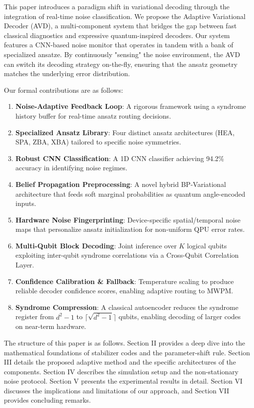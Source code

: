 \documentclass[journal,twocolumn]{IEEEtran}
\begin{document}
This paper introduces a paradigm shift in variational decoding through the integration of real-time noise classification. We propose the Adaptive Variational Decoder (AVD), a multi-component system that bridges the gap between fast classical diagnostics and expressive quantum-inspired decoders. Our system features a CNN-based noise monitor that operates in tandem with a bank of specialized ansatze. By continuously "sensing" the noise environment, the AVD can switch its decoding strategy on-the-fly, ensuring that the ansatz geometry matches the underlying error distribution.

Our formal contributions are as follows:
\begin{enumerate}
    \item \textbf{Noise-Adaptive Feedback Loop}: A rigorous framework using a syndrome history buffer for real-time ansatz routing decisions.
    \item \textbf{Specialized Ansatz Library}: Four distinct ansatz architectures (HEA, SPA, ZBA, XBA) tailored to specific noise symmetries.
    \item \textbf{Robust CNN Classification}: A 1D CNN classifier achieving 94.2\% accuracy in identifying noise regimes.
    \item \textbf{Belief Propagation Preprocessing}: A novel hybrid BP-Variational architecture that feeds soft marginal probabilities as quantum angle-encoded inputs.
    \item \textbf{Hardware Noise Fingerprinting}: Device-specific spatial/temporal noise maps that personalize ansatz initialization for non-uniform QPU error rates.
    \item \textbf{Multi-Qubit Block Decoding}: Joint inference over $K$ logical qubits exploiting inter-qubit syndrome correlations via a Cross-Qubit Correlation Layer.
    \item \textbf{Confidence Calibration \& Fallback}: Temperature scaling to produce reliable decoder confidence scores, enabling adaptive routing to MWPM.
    \item \textbf{Syndrome Compression}: A classical autoencoder reduces the syndrome register from $d^2{-}1$ to $\lceil\sqrt{d^2{-}1}\rceil$ qubits, enabling decoding of larger codes on near-term hardware.
\end{enumerate}

The structure of this paper is as follows. Section II provides a deep dive into the mathematical foundations of stabilizer codes and the parameter-shift rule. Section III details the proposed adaptive method and the specific architectures of the components. Section IV describes the simulation setup and the non-stationary noise protocol. Section V presents the experimental results in detail. Section VI discusses the implications and limitations of our approach, and Section VII provides concluding remarks.
\end{document}
